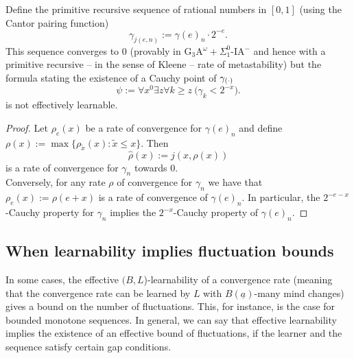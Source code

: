 \begin{cor}\label{c:gammaee}
Define the primitive recursive sequence of rational numbers in $[0,1]$  
(using the Cantor pairing function)
\[
\gamma_{j(e,n)}:= \gamma(e)_n\cdot 2^{-e}.
\]
This sequence converges to $0$ (provably in {\rm 
G$_3$A$^{\omega}+\Sigma^0_1$-IA$^-$} and hence with a primitive recursive -- 
in the sense of Kleene -- rate of metastability) but 
the formula stating the existence of a Cauchy point of $\gamma_{(\cdot)}$
\[
\psi:=\forall x^0\exists z \forall k\geq z\ \big( \gamma_k<2^{-x} \big).
\]
is not effectively learnable.
\end{cor}
\begin{proof} 
Let $\rho_e(x)$ be a rate of convergence for $\gamma(e)_n$ and define 
$\rho(x):=\max\{ \rho_{\tilde{x}}(x):\tilde{x}\le x\}.$ Then 
\[ \widehat{\rho}(x):=j(x,\rho(x)) \] is a rate of convergence for 
$\gamma_n$ towards $0.$
\\
Conversely, for any rate $\rho$ of convergence for $\gamma_n$ we have that 
$\rho_e(x):=\rho(e+x)$ is a rate of convergence of $\gamma(e)_n$. In 
particular, the $2^{-e-x}$-Cauchy property for $\gamma_n$ implies the 
$2^{-x}$-Cauchy property of $\gamma(e)_n.$
\end{proof}


\subsection{When learnability implies fluctuation bounds}


In some cases, the effective $(B,L$)-learnability of a convergence rate 
(meaning that the convergence rate can be learned by $L$ with 
$B(\underline{a})$-many mind 
changes) gives a bound on the number of fluctuations. This, for instance, 
is the case for bounded monotone sequences. In general, we can say that
effective learnability implies the existence of an
effective bound of fluctuations, if the learner and the sequence satisfy
certain gap conditions.

